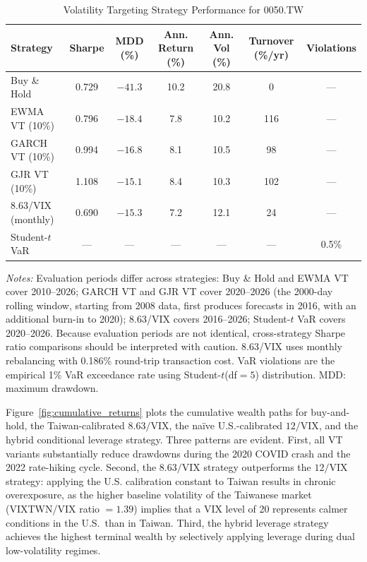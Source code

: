 \begin{table}[H]
\centering
\caption{Volatility Targeting Strategy Performance for 0050.TW}
\label{tab:vt_results}
\begin{tabular}{lcccccc}
\toprule
Strategy & Sharpe & MDD (\%) & Ann. Return (\%) & Ann. Vol (\%) & Turnover (\%/yr) & Violations \\
\midrule
Buy \& Hold & 0.729 & $-41.3$ & 10.2 & 20.8 & 0 & --- \\
EWMA VT (10\%) & 0.796 & $-18.4$ & 7.8 & 10.2 & 116 & --- \\
GARCH VT (10\%) & 0.994 & $-16.8$ & 8.1 & 10.5 & 98 & --- \\
GJR VT (10\%) & 1.108 & $-15.1$ & 8.4 & 10.3 & 102 & --- \\
8.63/VIX (monthly) & 0.690 & $-15.3$ & 7.2 & 12.1 & 24 & --- \\
Student-$t$ VaR & --- & --- & --- & --- & --- & 0.5\% \\
\bottomrule
\end{tabular}
\begin{flushleft}
\small \textit{Notes:} Evaluation periods differ across strategies: Buy \& Hold and EWMA VT cover 2010--2026; GARCH VT and GJR VT cover 2020--2026 (the 2000-day rolling window, starting from 2008 data, first produces forecasts in 2016, with an additional burn-in to 2020); 8.63/VIX covers 2016--2026; Student-$t$ VaR covers 2020--2026. Because evaluation periods are not identical, cross-strategy Sharpe ratio comparisons should be interpreted with caution. 8.63/VIX uses monthly rebalancing with 0.186\% round-trip transaction cost. VaR violations are the empirical 1\% VaR exceedance rate using Student-$t$(df$= 5$) distribution. MDD: maximum drawdown.
\end{flushleft}
\end{table}

Figure~\ref{fig:cumulative_returns} plots the cumulative wealth paths for buy-and-hold, the Taiwan-calibrated $8.63/\text{VIX}$, the na\"ive U.S.-calibrated $12/\text{VIX}$, and the hybrid conditional leverage strategy. Three patterns are evident. First, all VT variants substantially reduce drawdowns during the 2020 COVID crash and the 2022 rate-hiking cycle. Second, the $8.63/\text{VIX}$ strategy outperforms the $12/\text{VIX}$ strategy: applying the U.S. calibration constant to Taiwan results in chronic overexposure, as the higher baseline volatility of the Taiwanese market (VIXTWN/VIX ratio $= 1.39$) implies that a VIX level of 20 represents calmer conditions in the U.S.\ than in Taiwan. Third, the hybrid leverage strategy achieves the highest terminal wealth by selectively applying leverage during dual low-volatility regimes.

